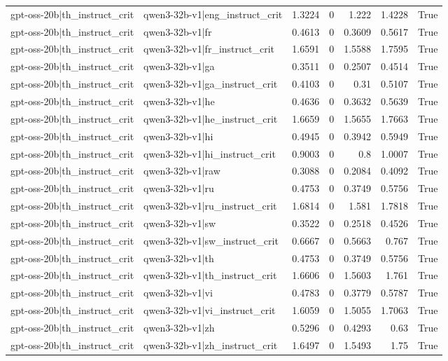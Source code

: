 \begin{table}
\begin{tabular}{l l r r r r l}
gpt-oss-20b|th_instruct_crit & qwen3-32b-v1|eng_instruct_crit & 1.3224 & 0 & 1.222 & 1.4228 & True \\
gpt-oss-20b|th_instruct_crit & qwen3-32b-v1|fr & 0.4613 & 0 & 0.3609 & 0.5617 & True \\
gpt-oss-20b|th_instruct_crit & qwen3-32b-v1|fr_instruct_crit & 1.6591 & 0 & 1.5588 & 1.7595 & True \\
gpt-oss-20b|th_instruct_crit & qwen3-32b-v1|ga & 0.3511 & 0 & 0.2507 & 0.4514 & True \\
gpt-oss-20b|th_instruct_crit & qwen3-32b-v1|ga_instruct_crit & 0.4103 & 0 & 0.31 & 0.5107 & True \\
gpt-oss-20b|th_instruct_crit & qwen3-32b-v1|he & 0.4636 & 0 & 0.3632 & 0.5639 & True \\
gpt-oss-20b|th_instruct_crit & qwen3-32b-v1|he_instruct_crit & 1.6659 & 0 & 1.5655 & 1.7663 & True \\
gpt-oss-20b|th_instruct_crit & qwen3-32b-v1|hi & 0.4945 & 0 & 0.3942 & 0.5949 & True \\
gpt-oss-20b|th_instruct_crit & qwen3-32b-v1|hi_instruct_crit & 0.9003 & 0 & 0.8 & 1.0007 & True \\
gpt-oss-20b|th_instruct_crit & qwen3-32b-v1|raw & 0.3088 & 0 & 0.2084 & 0.4092 & True \\
gpt-oss-20b|th_instruct_crit & qwen3-32b-v1|ru & 0.4753 & 0 & 0.3749 & 0.5756 & True \\
gpt-oss-20b|th_instruct_crit & qwen3-32b-v1|ru_instruct_crit & 1.6814 & 0 & 1.581 & 1.7818 & True \\
gpt-oss-20b|th_instruct_crit & qwen3-32b-v1|sw & 0.3522 & 0 & 0.2518 & 0.4526 & True \\
gpt-oss-20b|th_instruct_crit & qwen3-32b-v1|sw_instruct_crit & 0.6667 & 0 & 0.5663 & 0.767 & True \\
gpt-oss-20b|th_instruct_crit & qwen3-32b-v1|th & 0.4753 & 0 & 0.3749 & 0.5756 & True \\
gpt-oss-20b|th_instruct_crit & qwen3-32b-v1|th_instruct_crit & 1.6606 & 0 & 1.5603 & 1.761 & True \\
gpt-oss-20b|th_instruct_crit & qwen3-32b-v1|vi & 0.4783 & 0 & 0.3779 & 0.5787 & True \\
gpt-oss-20b|th_instruct_crit & qwen3-32b-v1|vi_instruct_crit & 1.6059 & 0 & 1.5055 & 1.7063 & True \\
gpt-oss-20b|th_instruct_crit & qwen3-32b-v1|zh & 0.5296 & 0 & 0.4293 & 0.63 & True \\
gpt-oss-20b|th_instruct_crit & qwen3-32b-v1|zh_instruct_crit & 1.6497 & 0 & 1.5493 & 1.75 & True \\

\end{tabular}
\end{table}

